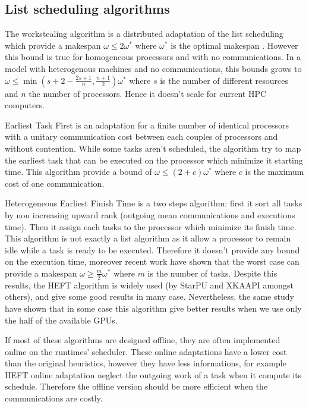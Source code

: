 \documentclass[10pt, conference, compsocconf,pdftex,dvipsnames]{IEEEtran}
\begin{document}
\subsection{List scheduling algorithms}

The workstealing algorithm is a distributed adaptation of the list scheduling
which provide a makespan $\omega\leq2\omega^*$ where $\omega^*$ is the optimal
makespan \cite{GrahamRL1966Bounds, GrahamRL1969Bounds}. However this bound is
true for homogeneous processors and with no communications. In a model with
heterogenous machines and no communications, this bounds grows to
$\omega\leq\min(s+2-\frac{2s+1}{n},\frac{n+1}{2})\omega^*$ where $s$ is the
number of different resources and $n$ the number of processors. Hence it
doesn't scale for current HPC computers. 

Earliest Task First\cite{hwang1989scheduling} is an adaptation for a finite
number of identical processors with a unitary communication cost between each
couples of processors and without contention. While some tasks aren't
scheduled, the algorithm try to map the earliest task that can be executed on
the processor which minimize it starting time. This algorithm provide a bound
of $\omega\leq(2+c)\omega^*$ where $c$ is the maximum cost of one
communication.  

Heterogeneous Earliest Finish Time \cite{topcuoglu2002performance}  is a two
steps algorithm: first it sort all tasks by non increasing upward rank
(outgoing mean communications and executions time). Then it assign each tasks
to the processor which minimize its finish time. This algorithm is not exactly
a list algorithm as it allow a processor to remain idle while a task is ready
to be executed.  Therefore it doesn't provide any bound on the execution time,
moreover recent work \cite{Kedad-SidhoumMonnaMounieEtAl2013} have shown that
the worst case can provide a makespan $\omega \geq \frac{m}{2}\omega^*$ where
$m$ is the number of tasks. Despite this results, the HEFT algorithm is widely
used (by StarPU and XKAAPI amongst others), and give some good results in many
case\cite{ferreiralima:hal-00735470}. Nevertheless, the same study have shown
that in some case this algorithm give better results when we use only the half
of the available GPUs.

If most of these algorithms are designed offline, they are often implemented
online on the runtimes' scheduler. These online adaptations have a lower cost
than the original heuristics, however they have less informations, for example
HEFT online adaptation neglect the outgoing work of a task when it compute its
schedule. Therefore the offline version should be more efficient when the
communications are costly.
\end{document}
